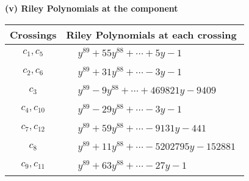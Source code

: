 \documentclass[1p]{elsarticle_modified}
\theoremstyle{definition}
\begin{document}
\newpage\renewcommand{\arraystretch}{1}
\flushleft \textbf{(v) Riley Polynomials at the component}\newline \\
\begin{tabular}{m{50pt}|m{274pt}}
Crossings & \hspace{64pt}Riley Polynomials at each crossing \\
\hline $$\begin{aligned}c_{1},c_{5}\end{aligned}$$&$\begin{aligned}
&y^{89}+55 y^{88}+\cdots+5 y-1
\end{aligned}$\\
\hline $$\begin{aligned}c_{2},c_{6}\end{aligned}$$&$\begin{aligned}
&y^{89}+31 y^{88}+\cdots-3 y-1
\end{aligned}$\\
\hline $$\begin{aligned}c_{3}\end{aligned}$$&$\begin{aligned}
&y^{89}-9 y^{88}+\cdots+469821 y-9409
\end{aligned}$\\
\hline $$\begin{aligned}c_{4},c_{10}\end{aligned}$$&$\begin{aligned}
&y^{89}-29 y^{88}+\cdots-3 y-1
\end{aligned}$\\
\hline $$\begin{aligned}c_{7},c_{12}\end{aligned}$$&$\begin{aligned}
&y^{89}+59 y^{88}+\cdots-9131 y-441
\end{aligned}$\\
\hline $$\begin{aligned}c_{8}\end{aligned}$$&$\begin{aligned}
&y^{89}+11 y^{88}+\cdots-5202795 y-152881
\end{aligned}$\\
\hline $$\begin{aligned}c_{9},c_{11}\end{aligned}$$&$\begin{aligned}
&y^{89}+63 y^{88}+\cdots-27 y-1
\end{aligned}$\\
\hline
\end{tabular}\\~\\
\end{document}
